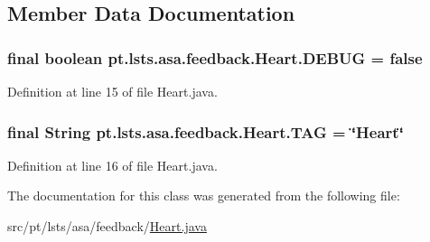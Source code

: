 \subsection{Member Data Documentation}
\hypertarget{classpt_1_1lsts_1_1asa_1_1feedback_1_1Heart_a7848f15d495eb933a5b17c03e9220a07}{}
\subsubsection[{D\+E\+B\+U\+G}]{\setlength{\rightskip}{0pt plus 5cm}final boolean pt.\+lsts.\+asa.\+feedback.\+Heart.\+D\+E\+B\+U\+G = false\hspace{0.3cm}{\ttfamily [static]}}\label{classpt_1_1lsts_1_1asa_1_1feedback_1_1Heart_a7848f15d495eb933a5b17c03e9220a07}


Definition at line 15 of file Heart.\+java.

\hypertarget{classpt_1_1lsts_1_1asa_1_1feedback_1_1Heart_ab6cf7d0de40636252d542f1616e36171}{}
\subsubsection[{T\+A\+G}]{\setlength{\rightskip}{0pt plus 5cm}final String pt.\+lsts.\+asa.\+feedback.\+Heart.\+T\+A\+G = \char`\"{}Heart\char`\"{}\hspace{0.3cm}{\ttfamily [static]}}\label{classpt_1_1lsts_1_1asa_1_1feedback_1_1Heart_ab6cf7d0de40636252d542f1616e36171}


Definition at line 16 of file Heart.\+java.



The documentation for this class was generated from the following file\+:\begin{DoxyCompactItemize}
\item 
src/pt/lsts/asa/feedback/\hyperlink{Heart_8java}{Heart.\+java}\end{DoxyCompactItemize}
